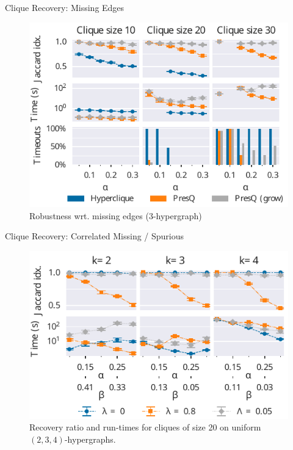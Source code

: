 \documentclass[10pt,notes]{beamer}
\begin{document}
\begin{frame}{Clique Recovery: Missing Edges}
    \begin{figure}
        \centering
        \includegraphics{3hyper_alpha}
        \caption{Robustness wrt. missing edges (3-hypergraph)}
    \end{figure}
\end{frame}

\begin{frame}{Clique Recovery: Correlated Missing / Spurious}
\begin{figure}
    \centering
    \includegraphics{quasi_corr_20}
    \caption{
    Recovery ratio and run-times for cliques of size 20 on uniform $(2,3,4)$-hypergraphs.
    }
\end{figure}

\end{frame}
\end{document}

